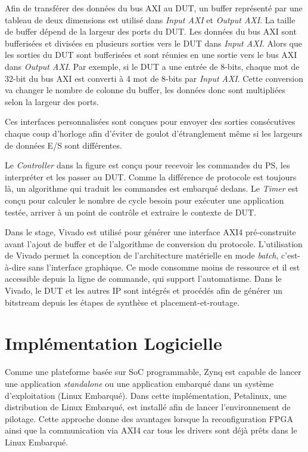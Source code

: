 Afin de transférer des données du bus AXI au DUT, un buffer représenté par une tableau de deux dimensions est utilisé dans
\emph{Input AXI} et \emph{Output AXI}. La taille de buffer dépend de la largeur des ports du DUT. 
Les données du bus AXI sont bufferisées et divisées en plusieurs sorties vers le DUT dans \emph{Input AXI}.
Alors que les sorties du DUT sont bufferisées et sont réunies en une sortie vers le bus AXI dans \emph{Output AXI}.
Par exemple, si le DUT a une entrée de 8-bits, chaque mot de 32-bit du bus AXI est converti à 4 mot de 8-bits par 
\emph{Input AXI}. Cette conversion va changer le nombre de colonne du buffer, les données donc sont multipliées
selon la largeur des ports.

Ces interfaces personnalisées sont conçues pour envoyer des sorties consécutives chaque coup d'horloge
afin d'éviter de goulot d'étranglement même si les largeurs de données E/S sont différentes.

Le \emph{Controller} dans la figure est conçu pour recevoir les commandes du PS, les interpréter et les passer au DUT.
Comme la différence de protocole est toujours là, un algorithme qui traduit les commandes est embarqué dedans.
Le \emph{Timer} est conçu pour calculer le nombre de cycle besoin pour exécuter une application testée,
arriver à un point de contrôle et extraire le contexte de DUT.

Dans le stage, Vivado est utilisé pour générer une interface AXI4 pré-construite avant l'ajout de buffer et de l'algorithme
de conversion du protocole.
L'utilisation de Vivado permet la conception de l'architecture matérielle en mode \emph{batch}, c'est-à-dire sans l'interface
graphique. Ce mode consomme moins de ressource et il est accessible depuis la ligne de commande, qui 
support l'automatisme. Dans le Vivado, le DUT et les autres IP sont intégrés et procédés afin de générer un bitstream
depuis les étapes de synthèse et placement-et-routage.


\section{Implémentation Logicielle}

Comme une plateforme basée sur SoC programmable, Zynq est capable de lancer une application \emph{standalone}
ou une application embarqué dans un système d'exploitation (Linux Embarqué). Dans cette implémentation,
Petalinux, une distribution de Linux Embarqué, est installé afin de lancer l'environnement de pilotage.
Cette approche donne des avantages lorsque la reconfiguration FPGA ainsi que la communication via
AXI4 car tous les drivers sont déjà prêts dans le Linux Embarqué.

